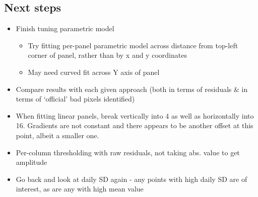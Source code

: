 \documentclass[10pt,fleqn]{article}
\begin{document}
\subsection*{Next steps}

\begin{itemize}

\item Finish tuning parametric model

\begin{itemize}
\item Try fitting per-panel parametric model across distance from top-left corner of panel, rather than by x and y coordinates
\item May need curved fit across Y axis of panel

\end{itemize}

\item Compare results with each given approach (both in terms of residuals \& in terms of `official' bad pixels identified)

\item When fitting linear panels, break vertically into 4 as well as horizontally into 16. Gradients are not constant and there appears to be another offset at this point, albeit a smaller one.

\item Per-column thresholding with raw residuals, not taking abs. value to get amplitude

\item Go back and look at daily SD again - any points with high daily SD are of interest, as are any with high mean value


\end{itemize}
\end{document}
